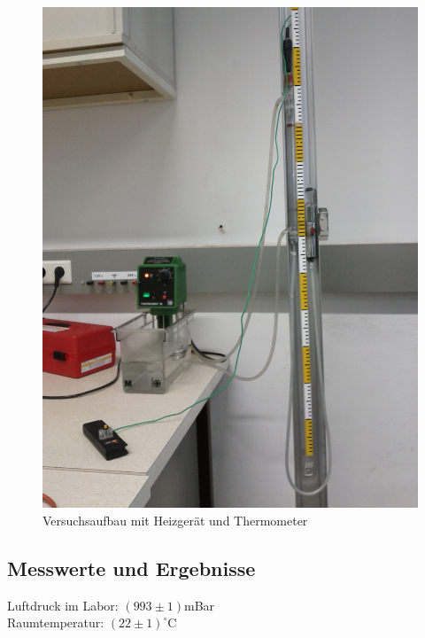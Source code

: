 \documentclass[12pt,a4paper]{article}
\begin{document}
\begin{multicols}{2}
\begin{figure}[H]
	\centering
	\includegraphics[scale=0.22]{./figure/gas_therm_aufbau.png}
	\caption{Versuchsaufbau mit Heizgerät und Thermometer}
	\label{fig:gas_therm_aufbau}
\end{figure}


\subsection{Messwerte und Ergebnisse}
Luftdruck im Labor: $(993\pm 1)$mBar\\
Raumtemperatur: $(22 \pm 1)^\circ $C


\end{multicols}
\end{document}
